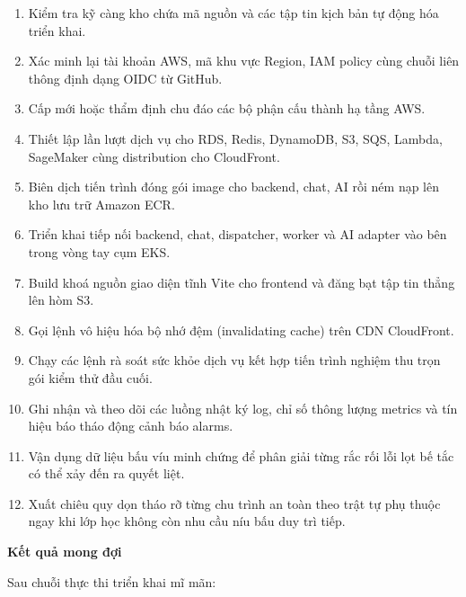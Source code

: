 \begin{enumerate}
\def\labelenumi{\arabic{enumi}.}
\tightlist
\item
  Kiểm tra kỹ càng kho chứa mã nguồn và các tập tin kịch bản tự động hóa
  triển khai.
\item
  Xác minh lại tài khoản AWS, mã khu vực Region, IAM policy cùng chuỗi
  liên thông định dạng OIDC từ GitHub.
\item
  Cấp mới hoặc thẩm định chu đáo các bộ phận cấu thành hạ tầng AWS.
\item
  Thiết lập lần lượt dịch vụ cho RDS, Redis, DynamoDB, S3, SQS, Lambda,
  SageMaker cùng distribution cho CloudFront.
\item
  Biên dịch tiến trình đóng gói image cho backend, chat, AI rồi ném nạp
  lên kho lưu trữ Amazon ECR.
\item
  Triển khai tiếp nối backend, chat, dispatcher, worker và AI adapter
  vào bên trong vòng tay cụm EKS.
\item
  Build khoá nguồn giao diện tĩnh Vite cho frontend và đăng bạt tập tin
  thẳng lên hòm S3.
\item
  Gọi lệnh vô hiệu hóa bộ nhớ đệm (invalidating cache) trên CDN
  CloudFront.
\item
  Chạy các lệnh rà soát sức khỏe dịch vụ kết hợp tiến trình nghiệm thu
  trọn gói kiểm thử đầu cuối.
\item
  Ghi nhận và theo dõi các luồng nhật ký log, chỉ số thông lượng metrics
  và tín hiệu báo tháo động cảnh báo alarms.
\item
  Vận dụng dữ liệu bấu víu minh chứng để phân giải từng rắc rối lỗi lọt
  bế tắc có thể xảy đến ra quyết liệt.
\item
  Xuất chiêu quy dọn tháo rỡ từng chu trình an toàn theo trật tự phụ
  thuộc ngay khi lớp học không còn nhu cầu níu bấu duy trì tiếp.
\end{enumerate}

\vspace{0.5em}\noindent\textbf{Kết quả mong đợi}\par

Sau chuỗi thực thi triển khai mĩ mãn:

